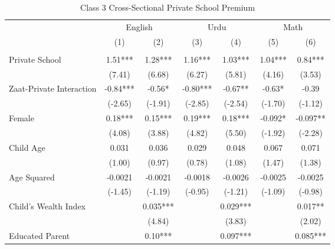 \begin{table}[htbp]\centering
\def\sym#1{\ifmmode^{#1}\else\(^{#1}\)\fi}
\caption{Class 3 Cross-Sectional Private School Premium\label{crosssection}}
\begin{tabular}{l*{6}{c}}
\toprule
                &\multicolumn{2}{c}{English}&\multicolumn{2}{c}{Urdu} &\multicolumn{2}{c}{Math} \\\cmidrule(lr){2-3}\cmidrule(lr){4-5}\cmidrule(lr){6-7}
                &\multicolumn{1}{c}{(1)}&\multicolumn{1}{c}{(2)}&\multicolumn{1}{c}{(3)}&\multicolumn{1}{c}{(4)}&\multicolumn{1}{c}{(5)}&\multicolumn{1}{c}{(6)}\\
                &\multicolumn{1}{c}{}&\multicolumn{1}{c}{}&\multicolumn{1}{c}{}&\multicolumn{1}{c}{}&\multicolumn{1}{c}{}&\multicolumn{1}{c}{}\\
\midrule
Private School  &     1.51***&     1.28***&     1.16***&     1.03***&     1.04***&     0.84***\\
                &   (7.41)   &   (6.68)   &   (6.27)   &   (5.81)   &   (4.16)   &   (3.53)   \\
Zaat-Private Interaction&    -0.84***&    -0.56*  &    -0.80***&    -0.67** &    -0.63*  &    -0.39   \\
                &  (-2.65)   &  (-1.91)   &  (-2.85)   &  (-2.54)   &  (-1.70)   &  (-1.12)   \\
Female          &     0.18***&     0.15***&     0.19***&     0.18***&   -0.092*  &   -0.097** \\
                &   (4.08)   &   (3.88)   &   (4.82)   &   (5.50)   &  (-1.92)   &  (-2.28)   \\
Child Age       &    0.031   &    0.036   &    0.029   &    0.048   &    0.067   &    0.071   \\
                &   (1.00)   &   (0.97)   &   (0.78)   &   (1.08)   &   (1.47)   &   (1.38)   \\
Age Squared     &  -0.0021   &  -0.0021   &  -0.0018   &  -0.0026   &  -0.0025   &  -0.0025   \\
                &  (-1.45)   &  (-1.19)   &  (-0.95)   &  (-1.21)   &  (-1.09)   &  (-0.98)   \\
Child's Wealth Index&            &    0.035***&            &    0.029***&            &    0.017** \\
                &            &   (4.84)   &            &   (3.83)   &            &   (2.02)   \\
Educated Parent &            &     0.10***&            &    0.097***&            &    0.085***\\

\end{tabular}
\end{table}
